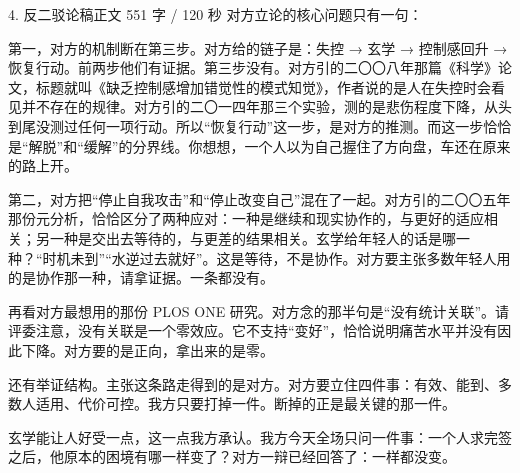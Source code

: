 \documentclass[script,con]{debate}
\begin{document}
\begin{speech}{4. 反二驳论稿}{正文 551 字 / 120 秒}
对方立论的核心问题只有一句：

第一，对方的机制断在第三步。对方给的链子是：失控 → 玄学 → 控制感回升 → 恢复行动。前两步他们有证据。第三步没有。对方引的二〇〇八年那篇《科学》论文，标题就叫《缺乏控制感增加错觉性的模式知觉》，作者说的是人在失控时会看见并不存在的规律。对方引的二〇一四年那三个实验，测的是悲伤程度下降，从头到尾没测过任何一项行动。所以“恢复行动”这一步，是对方的推测。而这一步恰恰是“解脱”和“缓解”的分界线。你想想，一个人以为自己握住了方向盘，车还在原来的路上开。

第二，对方把“停止自我攻击”和“停止改变自己”混在了一起。对方引的二〇〇五年那份元分析，恰恰区分了两种应对：一种是继续和现实协作的，与更好的适应相关；另一种是交出去等待的，与更差的结果相关。玄学给年轻人的话是哪一种？“时机未到”“水逆过去就好”。这是等待，不是协作。对方要主张多数年轻人用的是协作那一种，请拿证据。一条都没有。

再看对方最想用的那份 PLOS ONE 研究。对方念的那半句是“没有统计关联”。请评委注意，没有关联是一个零效应。它不支持“变好”，恰恰说明痛苦水平并没有因此下降。对方要的是正向，拿出来的是零。

还有举证结构。主张这条路走得到的是对方。对方要立住四件事：有效、能到、多数人适用、代价可控。我方只要打掉一件。断掉的正是最关键的那一件。

玄学能让人好受一点，这一点我方承认。我方今天全场只问一件事：一个人求完签之后，他原本的困境有哪一样变了？对方一辩已经回答了：一样都没变。

\begin{contingency}
\end{contingency}
\end{speech}
\end{document}
